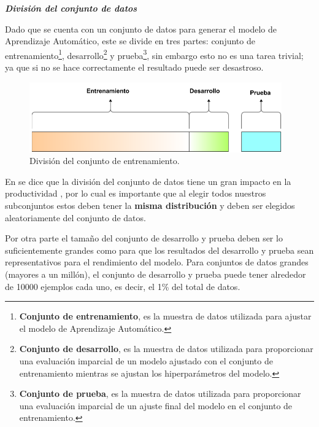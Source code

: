 \vspace{5mm} %

\textbf{\textit{Divisi\'{o}n del conjunto de datos}}

\vspace{5mm} %

Dado que se cuenta con un conjunto de datos para generar el modelo de Aprendizaje Autom\'{a}tico, este se divide en tres partes: conjunto de entrenamiento\footnote{\textbf{Conjunto de entrenamiento}, es la muestra de datos utilizada para ajustar el modelo de Aprendizaje Autom\'{a}tico.}, desarrollo\footnote{\textbf{Conjunto de desarrollo}, es la muestra de datos utilizada para proporcionar una evaluaci\'{o}n imparcial de un modelo ajustado con el conjunto de entrenamiento mientras se ajustan los hiperpar\'{a}metros del modelo.} y prueba\footnote{\textbf{Conjunto de prueba}, es la muestra de datos utilizada para proporcionar una evaluaci\'{o}n imparcial de un ajuste final del modelo en el conjunto de entrenamiento.}, sin embargo esto no es una tarea trivial; ya que si no se hace correctamente el resultado puede ser desastroso.

\vspace{5mm} %

\begin{figure}[h!]
  \begin{center}	\includegraphics[width=0.97\textwidth,frame]{imagenes/Cap3/train-dev-test}
  \caption{Divisi\'{o}n del conjunto de entrenamiento.}
  \label{fig:train-dev-test}
  \end{center}
\end{figure}

En \cite{41} se dice que la divisi\'{o}n del conjunto de datos tiene un gran impacto en la productividad , por lo cual es importante que al elegir todos nuestros subconjuntos estos deben tener la \textbf{misma distribuci\'{o}n} y deben ser elegidos aleatoriamente del conjunto de datos. 

\vspace{5mm} %

Por otra parte el tama\~{n}o del conjunto de desarrollo y prueba deben ser lo suficientemente grandes como para que los resultados del desarrollo y prueba sean representativos para el rendimiento del modelo. Para conjuntos de datos grandes (mayores a un mill\'{o}n), el conjunto de desarrollo y prueba puede tener alrededor de 10000 ejemplos cada uno, es decir, el 1\% del total de datos.

